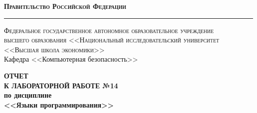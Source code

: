 \documentclass[a4paper, 12pt]{article}
\begin{document}
\begin{titlepage}

\begin{center}
{\textsc{\textbf{Правительство Российской Федерации}}}\\
\vspace{0.5cm}
\hrule
\vspace{0.5cm}
{\textsc{Федеральное государственное автономное образовательное учреждение\\высшего образования <<Национальный исследовательский университет\\<<Высшая школа экономики>>}}\\
\vspace{1cm}
Кафедра <<Компьютерная безопасность>>
\end{center}

\vspace{\fill}
\begin{center}
{\Large{\textbf{ОТЧЕТ \\ К ЛАБОРАТОРНОЙ РАБОТЕ №14}}} \\
\vspace{1em}
{\textbf{по дисциплине}} \\
\vspace{1em}
{\large{\textbf{<<Языки программирования>>}}}
\end{center}

\vspace{\fill}


\begin{flushright}
  \begin{minipage}[center]{15cm}


\end{minipage}
\end{flushright}
\end{titlepage}
\end{document}
